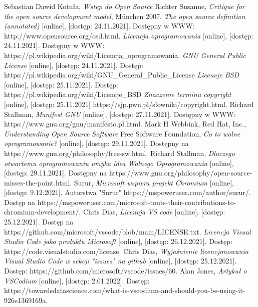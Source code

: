 \documentclass{article}
\begin{document}
\newpage
\begin{thebibliography}{99}
    Sebastian Dawid Kotuła, \emph{Wstęp do Open Source}
  Richter Susanne, \emph{Critique for the open source development model}, München 2007.
  \emph{The open source definition (annotated)} [online], [dostęp: 24.11.2021]. Dostępny w WWW: http://www.opensource.org/osd.html.
  \emph{Licencja oprogramowania} [online], [dostęp: 24.11.2021]. Dostępny w WWW: https://pl.wikipedia.org/wiki/Licencja\_oprogramowania.
  \emph{GNU General Public License} [online], [dostęp: 24.11.2021]. Dostęp: https://pl.wikipedia.org/wiki/GNU\_General\_Public\_License
  \emph{Licencje BSD} [online], [dostęp: 25.11.2021]. Dostęp: https://pl.wikipedia.org/wiki/Licencje\_BSD
  \emph{Znaczenie terminu copyright} [online], [dostęp: 25.11.2021] https://sjp.pwn.pl/slowniki/copyright.html.
  Richard Stallman, \emph{Manifest GNU} [online], [dostęp: 27.11.2021]. Dostępny w WWW: https://www.gnu.org/gnu/manifesto.pl.html.
  Mark H Webbink, Red Hat, Inc., \emph{Understanding Open Source Software}
  Free Software Foundation, \emph{Co to wolne oprogramowanie?} [online], [dostęp: 29.11.2021]. Dostępny na https://www.gnu.org/philosophy/free-sw.html.
  Richard Stallman, \emph{Dlaczego otwartemu oprogramowaniu umyka idea Wolnego Oprogramowania} [online], [dostęp: 29.11.2021]. Dostępny na https://www.gnu.org/philosophy/open-source-misses-the-point.html.
  Surur, \emph{Microsoft wspiera projekt Chromium} [online], [dostęp: 9.12.2021]. Autorstwa "Surur" https://mspoweruser.com/author/surur/. 
  Dostęp na https://mspoweruser.com/microsoft-touts-their-contributions-to-chromium-development/.
    Chris Dias, \emph{Licencja VS code} [online], [dostęp: 25.12.2021].
    Dostęp na https://github.com/microsoft/vscode/blob/main/LICENSE.txt.
    \emph{Licencja Visual Studio Code jako produktu Microsoft} [online], [dostęp: 26.12.2021].
    Dostęp: https://code.visualstudio.com/license.
    Chris Dias, \emph{Wyjaśnienie licencjonowania Visual Studio Code w sekcji "issues" na github} [online], [dostęp: 25.12.2021].
    Dostęp: https://github.com/microsoft/vscode/issues/60.    
    Alan Jones, \emph{Artykuł o VSCodium} [online], [dostęp: 2.01.2022].
    Dostęp: https://towardsdatascience.com/what-is-vscodium-and-should-you-be-using-it-926e1369169a.

\end{thebibliography}
\end{document}
